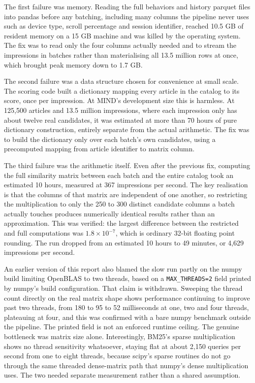 \documentclass[11pt]{article}
\begin{document}
The first failure was memory. Reading the full behaviors and history parquet files into pandas
before any batching, including many columns the pipeline never uses such as device type, scroll
percentage and session identifier, reached 10.5 GB of resident memory on a 15 GB machine and
was killed by the operating system. The fix was to read only the four columns actually needed
and to stream the impressions in batches rather than materialising all 13.5 million rows at
once, which brought peak memory down to 1.7 GB.

The second failure was a data structure chosen for convenience at small scale. The scoring code
built a dictionary mapping every article in the catalog to its score, once per impression. At
MIND's development size this is harmless. At 125,500 articles and 13.5 million impressions,
where each impression only has about twelve real candidates, it was estimated at more than 70
hours of pure dictionary construction, entirely separate from the actual arithmetic. The fix
was to build the dictionary only over each batch's own candidates, using a precomputed mapping
from article identifier to matrix column.

The third failure was the arithmetic itself. Even after the previous fix, computing the full
similarity matrix between each batch and the entire catalog took an estimated 10 hours,
measured at 367 impressions per second. The key realisation is that the columns of that matrix
are independent of one another, so restricting the multiplication to only the 250 to 300
distinct candidate columns a batch actually touches produces numerically identical results
rather than an approximation. This was verified: the largest difference between the restricted
and full computations was $1.8\times10^{-7}$, which is ordinary 32-bit floating point rounding.
The run dropped from an estimated 10 hours to 49 minutes, or 4,629 impressions per second.

An earlier version of this report also blamed the slow run partly on the numpy build limiting
OpenBLAS to two threads, based on a \texttt{MAX\_THREADS=2} field printed by numpy's build
configuration. That claim is withdrawn. Sweeping the thread count directly on the real matrix
shape shows performance continuing to improve past two threads, from 180 to 95 to 52
milliseconds at one, two and four threads, plateauing at four, and this was confirmed with a
bare numpy benchmark outside the pipeline. The printed field is not an enforced runtime
ceiling. The genuine bottleneck was matrix size alone. Interestingly, BM25's sparse
multiplication shows no thread sensitivity whatsoever, staying flat at about 2,150 queries per
second from one to eight threads, because scipy's sparse routines do not go through the same
threaded dense-matrix path that numpy's dense multiplication uses. The two needed separate
measurement rather than a shared assumption.
\end{document}
